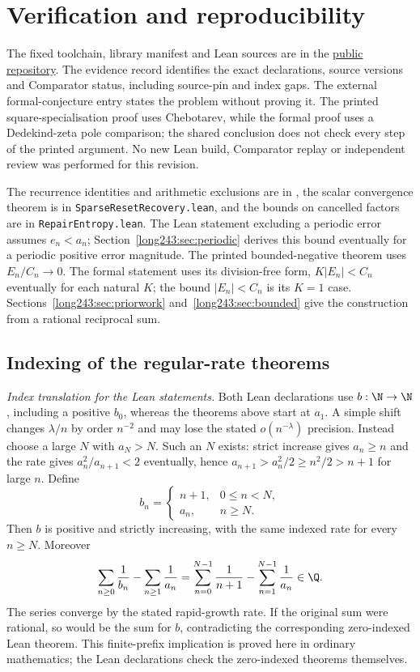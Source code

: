 \section{Verification and reproducibility}\label{long243:app:index}
\evidenceparagraph{\evidencerecordurl}
The fixed toolchain, library manifest and Lean sources are in the
\href{\sourceurl}{public repository}. The evidence record identifies
the exact declarations, source versions and Comparator status, including
source-pin and index gaps. The external formal-conjecture entry states
the problem without proving it. The printed square-specialisation proof
uses Chebotarev, while the formal proof uses a Dedekind-zeta pole comparison;
the shared conclusion does not check every step of the printed argument.
No new Lean build, Comparator replay or independent review was performed
for this revision.


The recurrence identities
and arithmetic exclusions are in , the
scalar convergence theorem is in \texttt{SparseResetRecovery.lean}, and
the bounds on cancelled factors are in \texttt{RepairEntropy.lean}.
The Lean statement excluding a periodic error assumes $e_n<a_n$;
Section~\ref{long243:sec:periodic} derives this bound eventually for a
periodic positive error magnitude. The printed bounded-negative theorem uses $E_n/C_n\to0$. The
formal statement uses its division-free form, $K|E_n|<C_n$ eventually
for each natural $K$; the bound $|E_n|<C_n$ is its $K=1$ case.
Sections~\ref{long243:sec:priorwork} and~\ref{long243:sec:bounded} give the
construction from a rational reciprocal sum.

\subsection*{Indexing of the regular-rate theorems}
\noindent\emph{Index translation for the Lean statements.} Both Lean
declarations use $b:\N\to\N$, including a positive $b_0$, whereas the
theorems above start at $a_1$. A simple shift changes $\lambda/n$ by
order $n^{-2}$ and may lose the stated $o(n^{-\lambda})$ precision.
Instead choose a
large $N$ with $a_N>N$. Such an $N$ exists: strict increase gives
$a_n\ge n$ and the rate gives $a_n^2/a_{n+1}<2$ eventually, hence
$a_{n+1}>a_n^2/2\ge n^2/2>n+1$ for large $n$. Define
\[
 b_n=\begin{cases}n+1,&0\le n<N,\\a_n,&n\ge N.\end{cases}
\]
Then $b$ is positive and strictly increasing, with the same indexed rate
for every $n\ge N$. Moreover
\[
 \sum_{n\ge0}\frac1{b_n}-\sum_{n\ge1}\frac1{a_n}
 =\sum_{n=0}^{N-1}\frac1{n+1}-\sum_{n=1}^{N-1}\frac1{a_n}\in\Q.
\]
The series converge by the stated rapid-growth rate. If the original
sum were rational, so would be the sum for $b$, contradicting the
corresponding zero-indexed Lean theorem. This finite-prefix implication
is proved here in ordinary mathematics; the Lean declarations check the
zero-indexed theorems themselves.

